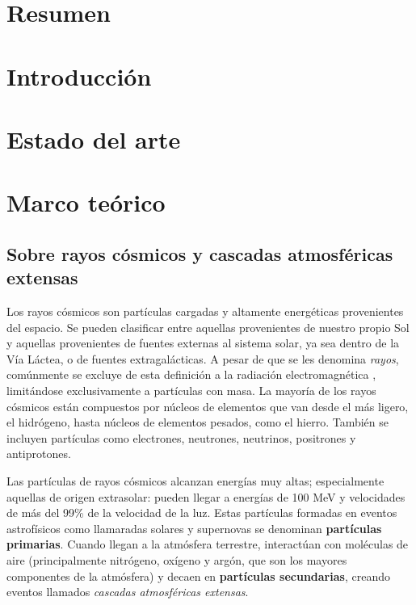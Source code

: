 \documentclass{report}
\begin{document}

\section*{Resumen}


\section*{Introducción}



\section*{Estado del arte}




\section*{Marco teórico}

\subsection*{Sobre rayos cósmicos y cascadas atmosféricas extensas}

Los rayos cósmicos son partículas cargadas y altamente energéticas provenientes del espacio. Se pueden clasificar entre aquellas provenientes de nuestro propio Sol y aquellas provenientes de fuentes externas al sistema solar, ya sea dentro de la Vía Láctea, o de fuentes extragalácticas. \cite{weatherMoldwin} A pesar de que se les denomina \textit{rayos}, comúnmente se excluye de esta definición a la radiación electromagnética \cite{NASACosmicopia}, limitándose exclusivamente a partículas con masa. La mayoría de los rayos cósmicos están compuestos por núcleos de elementos que van desde el más ligero, el hidrógeno, hasta núcleos de elementos pesados, como el hierro. También se incluyen partículas como electrones, neutrones, neutrinos, positrones y antiprotones. \cite{NASAImagine}

Las partículas de rayos cósmicos alcanzan energías muy altas; especialmente aquellas de origen extrasolar: pueden llegar a energías de 100 MeV y velocidades de más del 99\% de la velocidad de la luz. \cite{weatherMoldwin} Estas partículas formadas en eventos astrofísicos como llamaradas solares y supernovas se denominan \textbf{partículas primarias}. Cuando llegan a la atmósfera terrestre, interactúan con moléculas de aire (principalmente nitrógeno, oxígeno y argón, que son los mayores componentes de la atmósfera) y decaen en \textbf{partículas secundarias}, creando eventos llamados \textit{cascadas atmosféricas extensas}. \cite{EAS}
\end{document}
